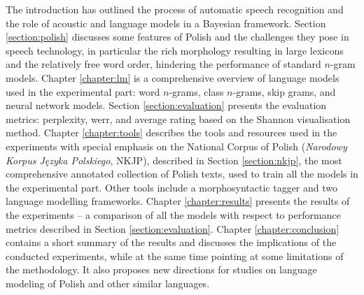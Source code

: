 The introduction has outlined the process of automatic speech recognition and the role of acoustic and language models in a Bayesian framework. Section \ref{section:polish} discusses some features of Polish and the challenges they pose in speech technology, in particular the rich morphology resulting in large lexicons and the relatively free word order, hindering the performance of standard $n$-gram models. 
Chapter \ref{chapter:lm} is a comprehensive overview of language models used in the experimental part: word $n$-grams, class $n$-grams, skip grams, and neural network models. Section \ref{section:evaluation} presents the evaluation metrics: perplexity, \gls{werr}, and average rating based on the Shannon visualisation method.
Chapter \ref{chapter:tools} describes the tools and resources used in the experiments with special emphasis on the National Corpus of Polish (\textit{Narodowy Korpus Języka Polskiego}, NKJP), described in Section \ref{section:nkjp}, the most comprehensive annotated collection of Polish texts, used to train all the models in the experimental part. Other tools include a morphosyntactic tagger and two language modelling frameworks.
Chapter \ref{chapter:results} presents the results of the experiments -- a comparison of all the models with respect to performance metrics described in Section \ref{section:evaluation}.
Chapter \ref{chapter:conclusion} contains a short summary of the results and discusses the implications of the conducted experiments, while at the same time pointing at some limitations of the methodology. It also proposes new directions for studies on language modeling of Polish and other similar languages.
